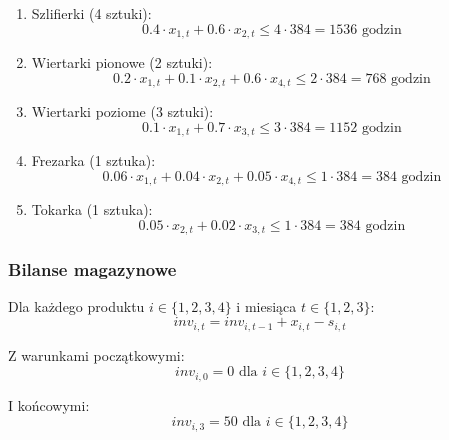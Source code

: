 \begin{enumerate}
  \item Szlifierki (4 sztuki):
  \begin{equation}
  0.4 \cdot x_{1,t} + 0.6 \cdot x_{2,t} \leq 4 \cdot 384 = 1536 \text{ godzin}
  \end{equation}

  \item Wiertarki pionowe (2 sztuki):
  \begin{equation}
  0.2 \cdot x_{1,t} + 0.1 \cdot x_{2,t} + 0.6 \cdot x_{4,t} \leq 2 \cdot 384 = 768 \text{ godzin}
  \end{equation}

  \item Wiertarki poziome (3 sztuki):
  \begin{equation}
  0.1 \cdot x_{1,t} + 0.7 \cdot x_{3,t} \leq 3 \cdot 384 = 1152 \text{ godzin}
  \end{equation}

  \item Frezarka (1 sztuka):
  \begin{equation}
  0.06 \cdot x_{1,t} + 0.04 \cdot x_{2,t} + 0.05 \cdot x_{4,t} \leq 1 \cdot 384 = 384 \text{ godzin}
  \end{equation}

  \item Tokarka (1 sztuka):
  \begin{equation}
  0.05 \cdot x_{2,t} + 0.02 \cdot x_{3,t} \leq 1 \cdot 384 = 384 \text{ godzin}
  \end{equation}
\end{enumerate}

\subsubsection{Bilanse magazynowe}

Dla każdego produktu $i \in \{1,2,3,4\}$ i miesiąca $t \in \{1,2,3\}$:
\begin{equation}
inv_{i,t} = inv_{i,t-1} + x_{i,t} - s_{i,t}
\end{equation}

Z warunkami początkowymi:
\begin{equation}
inv_{i,0} = 0 \text{ dla } i \in \{1,2,3,4\}
\end{equation}

I końcowymi:
\begin{equation}
inv_{i,3} = 50 \text{ dla } i \in \{1,2,3,4\}
\end{equation}

